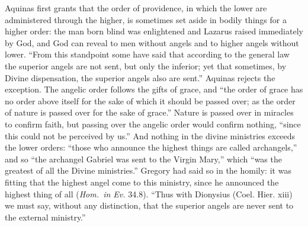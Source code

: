 Aquinas first grants that the order of providence, in which the lower are
administered through the higher, is sometimes set aside in bodily things
for a higher order: the man born blind was enlightened and Lazarus raised
immediately by God, and God can reveal to men without angels and to higher
angels without lower. ``From this standpoint some have said that according
to the general law the superior angels are not sent, but only the
inferior; yet that sometimes, by Divine dispensation, the superior angels
also are sent.'' Aquinas rejects the exception. The angelic order follows
the gifts of grace, and ``the order of grace has no order above itself for
the sake of which it should be passed over; as the order of nature is
passed over for the sake of grace.'' Nature is passed over in miracles to
confirm faith, but passing over the angelic order would confirm nothing,
``since this could not be perceived by us.'' And nothing in the divine
ministries exceeds the lower orders: ``those who announce the highest
things are called archangels,'' and so ``the archangel Gabriel was sent to
the Virgin Mary,'' which ``was the greatest of all the Divine ministries.''
Gregory had said so in the homily: it was fitting that the highest angel
come to this ministry, since he announced the highest thing of all
(\emph{Hom.\ in Ev.} 34.8). ``Thus with Dionysius (Coel. Hier. xiii) we must say, without
any distinction, that the superior angels are never sent to the external
ministry.''


